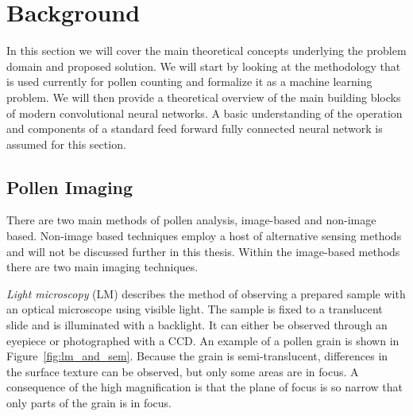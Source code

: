 \chapter{Background}\label{cha:background}
In this section we will cover the main theoretical concepts underlying the problem domain and proposed solution.
We will start by looking at the methodology that is used currently for pollen counting and formalize it as a machine learning problem.
We will then provide a theoretical overview of the main building blocks of modern convolutional neural networks.
A basic understanding of the operation and components of a standard feed forward fully connected neural network is assumed for this section.

\section{Pollen Imaging}
There are two main methods of pollen analysis, image-based and non-image based.
Non-image based techniques employ a host of alternative sensing methods and will not be discussed further in this thesis.
Within the image-based methods there are two main imaging techniques.

\textit{Light microscopy} (LM) describes the method of observing a prepared sample with an optical microscope using visible light.
The sample is fixed to a translucent slide and is illuminated with a backlight.
It can either be observed through an eyepiece or photographed with a CCD\@.
An example of a pollen grain is shown in Figure~\ref{fig:lm_and_sem}.
Because the grain is semi-translucent, differences in the surface texture can be observed, but only some areas are in focus.
A consequence of the high magnification is that the plane of focus is so narrow that only parts of the grain is in focus.

